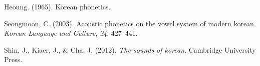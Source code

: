 \documentclass[man, fleqn, noextraspace]{apa6}
\begin{document}
\begingroup
\setlength{\parindent}{-0.5in} \setlength{\leftskip}{0.5in}

\hypertarget{refs}{}
\hypertarget{ref-Heo1965}{}
Heoung. (1965). Korean phonetics.

\hypertarget{ref-Cho2003}{}
Seongmoon, C. (2003). Acoustic phonetics on the vowel system of modern
korean. \emph{Korean Language and Culture}, \emph{24}, 427--441.

\hypertarget{ref-Shin2012}{}
Shin, J., Kiaer, J., \& Cha, J. (2012). \emph{The sounds of korean}.
Cambridge University Press.

\endgroup
\end{document}
